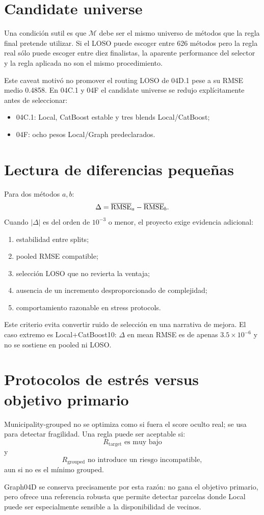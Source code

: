 \section{Candidate universe}

Una condición sutil es que $\mathcal M$ debe ser el mismo universo de métodos que la regla
final pretende utilizar. Si el LOSO puede escoger entre 626 métodos pero la regla real sólo
puede escoger entre diez finalistas, la aparente performance del selector y la regla aplicada
no son el mismo procedimiento.

Este caveat motivó no promover el routing LOSO de 04D.1 pese a su RMSE medio 0.4858. En 04C.1
y 04F el candidate universe se redujo explícitamente antes de seleccionar:
\begin{itemize}
\item 04C.1: Local, CatBoost estable y tres blends Local/CatBoost;
\item 04F: ocho pesos Local/Graph predeclarados.
\end{itemize}

\section{Lectura de diferencias pequeñas}

Para dos métodos $a,b$:
\[
\Delta=\overline{\operatorname{RMSE}}_a-\overline{\operatorname{RMSE}}_b.
\]
Cuando $|\Delta|$ es del orden de $10^{-3}$ o menor, el proyecto exige evidencia adicional:
\begin{enumerate}
\item estabilidad entre splits;
\item pooled RMSE compatible;
\item selección LOSO que no revierta la ventaja;
\item ausencia de un incremento desproporcionado de complejidad;
\item comportamiento razonable en stress protocols.
\end{enumerate}

Este criterio evita convertir ruido de selección en una narrativa de mejora. El caso extremo es
Local+CatBoost10: $\Delta$ en mean RMSE es de apenas $3.5\times10^{-6}$ y no se sostiene en
pooled ni LOSO.

\section{Protocolos de estrés versus objetivo primario}

Municipality-grouped no se optimiza como si fuera el score oculto real; se usa para detectar
fragilidad. Una regla puede ser aceptable si:
\[
R_{\mathrm{target}} \text{ es muy bajo}
\]
y
\[
R_{\mathrm{grouped}} \text{ no introduce un riesgo incompatible},
\]
aun si no es el mínimo grouped.

Graph04D se conserva precisamente por esta razón: no gana el objetivo primario, pero ofrece
una referencia robusta que permite detectar parcelas donde Local puede ser especialmente
sensible a la disponibilidad de vecinos.
